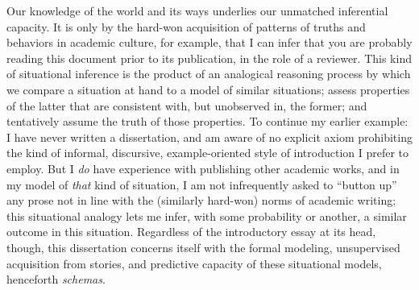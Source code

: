 Our knowledge of the world and its ways underlies our unmatched inferential capacity.
It is only by the hard-won acquisition of patterns of truths and behaviors in academic culture, for example, that I can infer that you are probably reading this document prior to its publication, in the role of a reviewer.
This kind of situational inference is the product of an analogical reasoning process by which we compare a situation at hand to a model of similar situations; assess properties of the latter that are consistent with, but unobserved in, the former; and tentatively assume the truth of those properties.
To continue my earlier example: I have never written a dissertation, and am aware of no explicit axiom prohibiting the kind of informal, discursive, example-oriented style of introduction I prefer to employ.
But I \textit{do} have experience with publishing other academic works, and in my model of \textit{that} kind of situation, I am not infrequently asked to ``button up'' any prose not in line with the (similarly hard-won) norms of academic writing; this situational analogy lets me infer, with some probability or another, a similar outcome in this situation.
Regardless of the introductory essay at its head, though, this dissertation concerns itself with the formal modeling, unsupervised acquisition from stories, and predictive capacity of these situational models, henceforth \textit{schemas}.